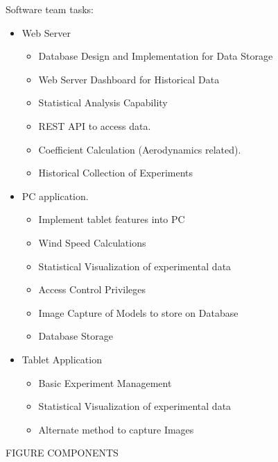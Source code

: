 	Software team tasks:
	\begin{itemize}
		\item Web Server
		\begin{itemize}
			\item Database Design and Implementation for Data Storage
			\item Web Server Dashboard for Historical Data
			\item Statistical Analysis Capability
			\item REST API to access data.
			\item Coefficient Calculation (Aerodynamics related).
			\item Historical Collection of Experiments
		\end{itemize}
		\item PC application.
		\begin{itemize}
			\item Implement tablet features into PC
			\item Wind Speed Calculations
			\item Statistical Visualization of experimental data
			\item Access Control Privileges
			\item Image Capture of Models to store on Database
			\item Database Storage
		\end{itemize}
		\item Tablet Application
		\begin{itemize}
			\item Basic Experiment Management
			\item Statistical Visualization of experimental data
			\item Alternate method to capture Images
		\end{itemize}
	\end{itemize}


	FIGURE COMPONENTS